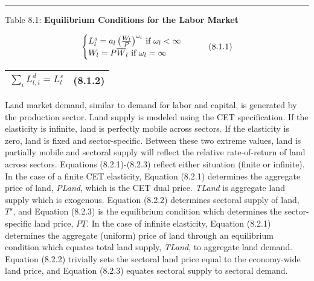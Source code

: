 \documentclass[12pt]{article}
\begin{document}
\noindent\rule{\linewidth}{0.4pt}
\begin{center}
\begin{large}
{\centering Table 8.1: \textbf{Equilibrium Conditions for the Labor Market} \par}

\begin{equation}
    \begin{cases}
      $$L^s_l = a_l \left(\frac{W_l}{P} \right)^{\omega_l}$$ \text{ if } $$\omega_l < \infty$$\\
      $$W_l = P \overline{W}_l$$ \text{ if } $$\omega_l = \infty$$\\
    \end{cases}
    \tag{8.1.1}
\end{equation}

\begin{tabular}{>{\raggedright}p{} l}

$\displaystyle \sum_i L^d_{l, i} = L^s_l$ & (8.1.2)\\[15pt]

\hline
\end{tabular}
\end{large}
\end{center}

Land market demand, similar to demand for labor and capital, is generated by the production sector. Land supply is modeled using the CET specification. If the elasticity is infinite, land is perfectly mobile across sectors. If the elasticity is zero, land is fixed and sector-specific. Between these two extreme values, land is partially mobile and sectoral supply will reflect the relative rate-of-return of land across sectors. Equations (8.2.1)-(8.2.3) reflect either situation (finite or infinite). In the case of a finite CET elasticity, Equation (8.2.1) determines the aggregate price of land, \textit{PLand}, which is the CET dual price. \textit{TLand} is aggregate land supply which is exogenous. Equation (8.2.2) determines sectoral supply of land, $T^s$, and Equation (8.2.3) is the equilibrium condition which determines the sector-specific land price, $PT$. In the case of infinite elasticity, Equation (8.2.1) determines the aggregate (uniform) price of land through an equilibrium condition which equates total land supply, \textit{TLand}, to aggregate land demand. Equation (8.2.2) trivially sets the sectoral land price equal to the economy-wide land price, and Equation (8.2.3) equates sectoral supply to sectoral demand.
\end{document}
